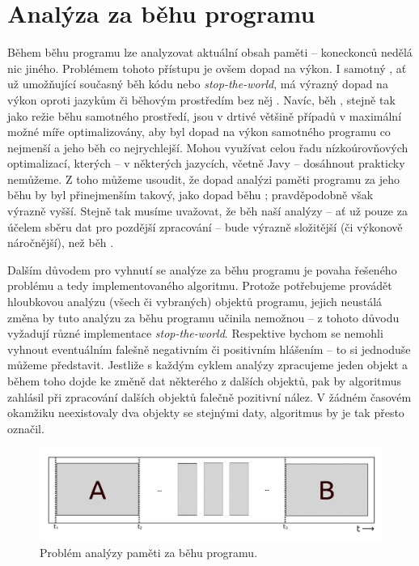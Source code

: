 \section{Analýza za běhu programu}
\label{runtime-analysis}
Během běhu programu lze analyzovat aktuální obsah paměti --  koneckonců nedělá nic jiného. Problémem tohoto přístupu je ovšem dopad na výkon. I samotný , ať už umožňující současný běh kódu nebo \textit{stop-the-world}, má výrazný dopad na výkon oproti jazykům či běhovým prostředím bez něj \cite{gc}. Navíc, běh , stejně tak jako režie běhu samotného prostředí, jsou v drtivé většině případů v maximální možné míře optimalizovány, aby byl dopad na výkon samotného programu co nejmenší a jeho běh co nejrychlejší. Mohou využívat celou řadu nízkoúrovňových optimalizací, kterých -- v některých jazycích, včetně Javy -- dosáhnout prakticky nemůžeme. Z toho můžeme usoudit, že dopad analýzi paměti programu za jeho běhu by byl přinejmenším takový, jako dopad běhu ; pravděpodobně však výrazně vyšší. Stejně tak musíme uvažovat, že běh naší analýzy -- ať už pouze za účelem sběru dat pro pozdější zpracování -- bude výrazně složitější (či výkonově náročnější), než běh .

Dalším důvodem pro vyhnutí se analýze za běhu programu je povaha řešeného problému a tedy implementovaného algoritmu. Protože potřebujeme provádět hloubkovou analýzu (všech či vybraných) objektů programu, jejich neustálá změna by tuto analýzu za běhu programu učinila nemožnou -- z tohoto důvodu vyžadují různé implementace  \textit{stop-the-world}. Respektive bychom se nemohli vyhnout eventuálním falešně negativním či positivním hlášením -- to si jednoduše můžeme představit. Jestliže s každým cyklem analýzy zpracujeme jeden objekt a během toho dojde ke změně dat některého z dalších objektů, pak by algoritmus zahlásil při zpracování dalších objektů falečně pozitivní nález. V žádném časovém okamžiku neexistovaly dva objekty se stejnými daty, algoritmus by je tak přesto označil.


\begin{figure}[h]
	\centering
	\includegraphics[scale=0.5]{obrazky/runtime-analysis.png}
	\caption{Problém analýzy paměti za běhu programu.}
	\label{obrRuntimeAnalysis}
\end{figure}



